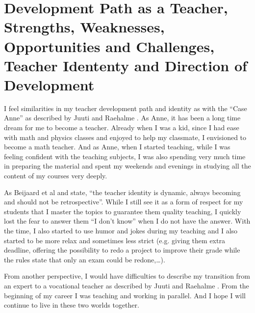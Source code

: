 \section{ Development Path as a Teacher, Strengths, Weaknesses, Opportunities and Challenges, Teacher Idententy and Direction of Development}

I feel similarities in my teacher development path and identity as with the ``Case Anne'' as described by Juuti and Raehalme \cite{juuti_2013}. 
As Anne, it has been a long time dream for me to become a teacher. 
Already when I was a kid, since I had ease with math and physics classes and enjoyed to help my classmate, I envisioned to become a math teacher.
And as Anne, when I started teaching, while I was feeling confident with the teaching subjects, I was also spending very much time in preparing the material and spent my weekends and evenings in studying all the content of my courses very deeply. 


As Beijaard et al \cite{Beijaard_2004} and \citeauthor{nissila_2013_DNW} \cite{nissila_2013_DNW} state, ``the teacher identity is dynamic, always becoming and should not be retrospective''. 
While I still see it as a form of respect for my students that I master the topics to guarantee them quality teaching, I quickly lost the fear to answer them ``I don't know'' when I do not have the answer. 
With the time, I also started to use humor and jokes during my teaching and I also started to be more relax and sometimes less strict (e.g. giving them extra deadline, offering the possibility to redo a project to improve their grade while the rules state that only an exam could be redone,\ldots). 

From another perspective, I would have difficulties to describe my transition from an expert to a vocational teacher as described by Juuti and Raehalme \cite{juuti_2013}. From the beginning of my career I was teaching and working in parallel. And I hope I will continue to live in these two worlds together.

  
  
  
  
  
  